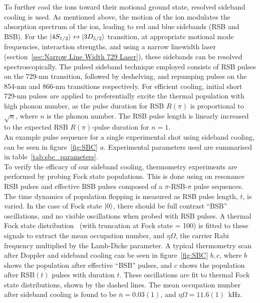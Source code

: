     To further cool the ions toward their motional ground state, resolved
    sideband cooling is used. As mentioned above, the motion of the ion
    modulates the absorption spectrum of the ion, leading to red and blue sidebands (RSB and BSB). For the $\ket{4S_{1/2}} \leftrightarrow
    \ket{3D_{5/2}}$ transition, at appropriate motional mode
    frequencies, interaction strengths, and using a narrow linewidth laser (section~\ref{sec:Narrow Line Width 729 Laser}), these sidebands can be resolved spectroscopically. The pulsed
    sideband technique employed consists of RSB pulses on the 729-nm transition, followed by
    deshelving, and repumping pulses on the 854-nm and 866-nm transitions
    respectively. 
    For efficient cooling, initial short 729-nm pulses are applied to preferentially excite the thermal population with high phonon number, as the pulse duration for RSB $R(\pi)$ is proportional to $\sqrt{n}$, where $n$ is the phonon number.  The RSB pulse length is linearly increased to the expected RSB $R(\pi)$-pulse duration for $n=1$.\\
    An example pulse sequence for a single experimental shot using sideband cooling, can be seen in
    figure~\ref{fig:SBC} $a$. Experimental parameters used are summarised in table~\ref{tab:sbc_parameters}.\\
    To verify the efficacy of our sideband cooling, thermometry
    experiments are performed by probing Fock state populations. This is done using on resonance RSB pulses and effective BSB pulses composed of a $\pi$-RSB-$\pi$ pulse
    sequences. The time dynamics of population flopping is measured as RSB
    pulse length, $t$, is varied. In the case of Fock state $\ket{0}$, there should be full contrast 
    ``BSB'' oscillations, and no visible oscillations when probed with RSB pulses. A thermal
    Fock state distribution~\cite{meekhof1996generation} (with truncation at Fock state = 100) is fitted to these
    signals to extract the mean occupation number, and $\eta\Omega$, the carrier
    Rabi frequency multiplied by the Lamb-Dicke parameter. A typical thermometry
    scan after Doppler and sideband cooling can be seen in
    figure~\ref{fig:SBC} $b, c$, where $b$ shows the population after effective ``BSB'' pulses, and $c$ shows the population after RSB$(t)$ pulses with duration $t$. These oscillations are fit to thermal Fock state distributions, shown by the dashed lines. The mean occupation
    number after sideband cooling is found to be $\bar{n} = 0.03(1)$, and $\eta\Omega =
    11.6(1)$~\unit{\kHz}.\\

